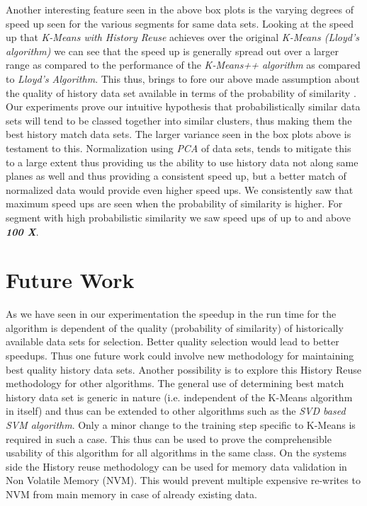 \documentclass{vldb}
\begin{document}
Another interesting feature seen in the above box plots is the varying degrees of speed up seen for the various segments for same data sets. Looking at the speed up that \textit{K-Means with History Reuse} achieves over the original \textit{K-Means (Lloyd’s algorithm)} we can see that the speed up is generally spread out over a larger range as compared to the performance of the \textit{K-Means++ algorithm} as compared to \textit{Lloyd’s Algorithm}. This thus, brings to fore our above made assumption about the quality of history data set available in terms of the probability of similarity . Our experiments prove our intuitive hypothesis that probabilistically similar data sets will tend to be classed together into similar clusters, thus making them the best history match data sets. The larger variance seen in the box plots above is testament to this. Normalization using \textit{PCA} of data sets, tends to mitigate this to a large extent thus providing us the ability to use history data not along same planes as well and thus providing a consistent speed up, but a better match of normalized data would provide even higher speed ups. We consistently saw that maximum speed ups are seen when the probability of similarity is higher. For segment with high probabilistic similarity we saw speed ups of up to and above \textit{\textbf{100 X}}.

\section{Future Work}
\label{chap-six}
As we have seen in our experimentation the speedup in the run time for the algorithm is dependent of the quality (probability of similarity) of historically available data sets for selection. Better quality selection would lead to better speedups. Thus one future work could involve new methodology for maintaining best quality history data sets.
Another possibility is to explore this History Reuse methodology for other algorithms. The general use of determining best match history data set is generic in nature (i.e. independent of the K-Means algorithm in itself) and thus can be extended to other algorithms such as the \textit{SVD based SVM algorithm}. Only a minor change to the training step specific to K-Means is required in such a case. This thus can be used to prove the comprehensible usability of this algorithm for all algorithms in the same class.
On the systems side the History reuse methodology can be used for memory data validation in Non Volatile Memory (NVM). This would prevent multiple expensive re-writes to NVM from main memory in case of already existing data.
\end{document}
